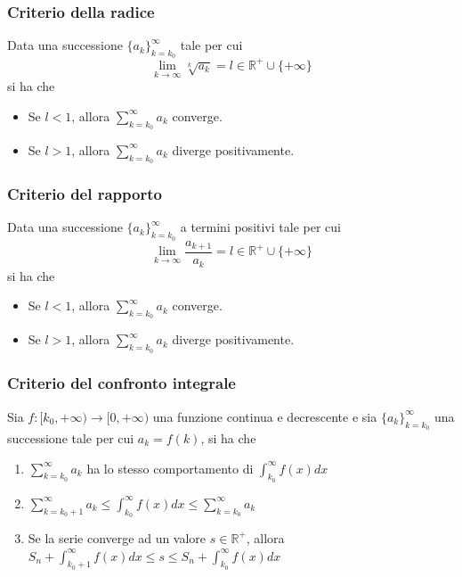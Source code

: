 \documentclass{article}
\begin{document}
            \vspace{10pt}
            \subsubsection{Criterio della radice}
                Data una successione $\{a_{k}\}_{k = k_{0}}^{\infty}$ tale per cui
                \[
                    \lim_{k \rightarrow \infty} \sqrt[k]{a_{k}} = l \in \mathbb{R}^{+} \cup \{+\infty\}
                \]
                si ha che  
                \begin{itemize}
                    \item Se $l < 1$, allora $\sum_{k = k_{0}}^{\infty} a_{k}$ converge.
                    \item Se $l > 1$, allora $\sum_{k = k_{0}}^{\infty} a_{k}$ diverge positivamente.
                \end{itemize}
            
            \vspace{10pt}
            \subsubsection{Criterio del rapporto}
                Data una successione $\{a_{k}\}_{k = k_{0}}^{\infty}$ a termini positivi tale per cui
                \[
                    \lim_{k \rightarrow \infty} \frac{a_{k + 1}}{a_{k}} = l \in \mathbb{R}^{+} \cup \{+\infty\}
                \]
                si ha che
                \begin{itemize}
                    \item Se $l < 1$, allora $\sum_{k = k_{0}}^{\infty} a_{k}$ converge.
                    \item Se $l > 1$, allora $\sum_{k = k_{0}}^{\infty} a_{k}$ diverge positivamente.
                \end{itemize}

            \vspace{10pt}
            \subsubsection{Criterio del confronto integrale}
                Sia $f: [k_{0}, +\infty) \rightarrow [0, +\infty)$ una funzione continua e decrescente e sia $\{a_{k}\}_{k = k_{0}}^{\infty}$ una successione tale per cui $a_{k} = f(k)$, si ha che
                \begin{enumerate}[label=(\arabic*)]
                    \item $\displaystyle \sum_{k = k_{0}}^{\infty} a_{k}$ ha lo stesso comportamento di $\displaystyle \int_{k_{0}}^{\infty} f(x) dx$
                    \item $\displaystyle \sum_{k = k_{0} + 1}^{\infty} a_{k} \leq \int_{k_{0}}^{\infty} f(x) dx \leq \sum_{k = k_{0}}^{\infty} a_{k}$
                    \item Se la serie converge ad un valore $s \in \mathbb{R}^{+}$, allora $\displaystyle S_{n} + \int_{k_{0} + 1}^{\infty} f(x) dx \leq s \leq S_{n} + \int_{k_{0}}^{\infty} f(x) dx$
                \end{enumerate}
            
\end{document}

